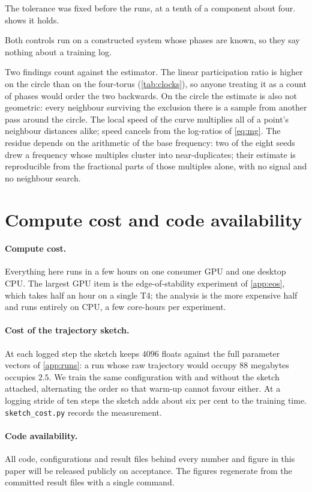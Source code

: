 \documentclass{article}
\begin{document}
The tolerance was fixed before the runs, at a tenth of a component about four.
 shows it holds.

Both controls run on a constructed system whose phases are known, so they say nothing about a
training log.

Two findings count against the estimator. The linear participation ratio is higher on the circle
than on the four-torus (\cref{tab:clocks}), so anyone treating it as a count of phases would order
the two backwards. On the circle the estimate is also not geometric: every neighbour surviving the
exclusion there is a sample from another pass around the circle. The local speed of the curve
multiplies all of a point's neighbour distances alike; speed cancels from the log-ratios of
\cref{eq:mg}. The
residue depends on the arithmetic of the base frequency: two of the eight seeds drew a frequency
whose multiples cluster into near-duplicates; their estimate is reproducible from the fractional
parts of those multiples alone, with no signal and no neighbour search.

\section{Compute cost and code availability}\label{app:compute}

\paragraph{Compute cost.} Everything here runs in a few hours on one consumer GPU and one desktop
CPU. The largest GPU item is the edge-of-stability experiment of \cref{app:eos},
which takes half an hour on a single T4; the analysis is the more expensive half and runs entirely
on CPU, a few core-hours per experiment.

\paragraph{Cost of the trajectory sketch.} At each logged step the sketch keeps $4096$ floats
against the full parameter vectors of \cref{app:runs}: a run whose raw trajectory would occupy $88$
megabytes occupies $2.5$. We train the same configuration with and without the sketch attached,
alternating the order so that warm-up cannot favour either. At a logging stride of ten steps the
sketch adds about six per cent to the training time. \texttt{sketch\_cost.py} records the
measurement.

\paragraph{Code availability.} All code, configurations and result files behind every number and
figure in this paper will be released publicly on acceptance. The figures regenerate from the
committed result files with a single command.
\end{document}
